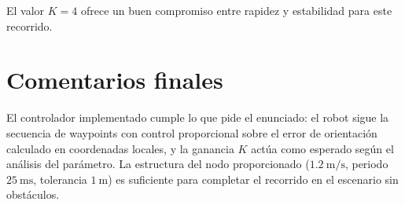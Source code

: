 El valor $K = 4$ ofrece un buen compromiso entre rapidez y estabilidad para este recorrido.


\section{Comentarios finales}

El controlador implementado cumple lo que pide el enunciado: el robot sigue la secuencia de waypoints con control proporcional sobre el error de orientaci\'{o}n calculado en coordenadas locales, y la ganancia $K$ act\'{u}a como esperado seg\'{u}n el an\'{a}lisis del par\'{a}metro. La estructura del nodo proporcionado ($\SI{1.2}{\meter\per\second}$, periodo $\SI{25}{\milli\second}$, tolerancia $\SI{1}{\meter}$) es suficiente para completar el recorrido en el escenario sin obst\'{a}culos.
